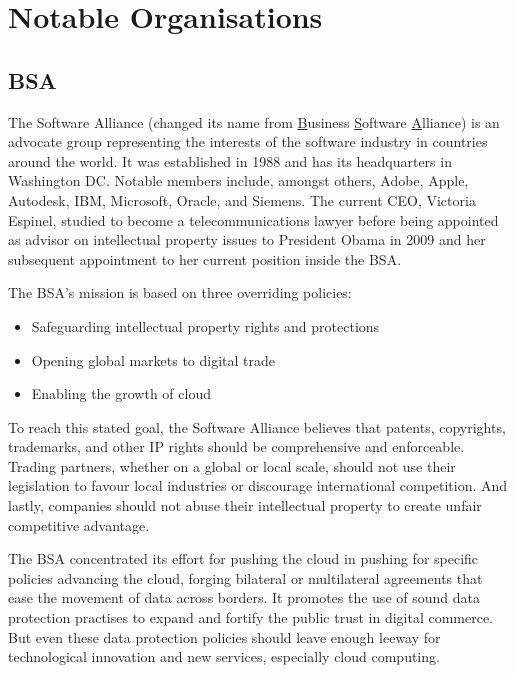 \documentclass[a4paper]{report}
\begin{document}
\section{Notable Organisations}
\label{sec:Orgas}

\subsection{BSA}
\label{ssec:BSA}
The Software Alliance (changed its name from \underline{B}usiness \underline{S}oftware \underline{A}lliance) is an advocate group representing the interests of the software industry in countries around the world. It was established in 1988 and has its headquarters in Washington DC. Notable members include, amongst others, Adobe, Apple, Autodesk, IBM, Microsoft, Oracle, and Siemens. The current CEO, Victoria Espinel, studied to become a telecommunications lawyer before being appointed as advisor on intellectual property issues to President Obama in 2009 and her subsequent appointment to her current position inside the BSA. \parencite{Rogers2017}
\vspace{\baselineskip}

\noindent The BSA's mission is based on three overriding policies:
\begin{itemize}
	\item Safeguarding intellectual property rights and protections
	\item Opening global markets to digital trade
	\item Enabling the growth of cloud 
\end{itemize}
\parencite{BSA2017}


To reach this stated goal, the Software Alliance believes that patents, copyrights, trademarks, and other IP rights should be comprehensive and enforceable. Trading partners, whether on a global or local scale, should not use their legislation to favour local industries or discourage international competition. And lastly, companies should not abuse their intellectual property to create unfair competitive advantage.

The BSA concentrated its effort for pushing the cloud in pushing for specific policies advancing the cloud, forging bilateral or multilateral agreements that ease the movement of data across borders. It promotes the use of sound data protection practises to expand and fortify the public trust in digital commerce. But even these data protection policies should leave enough leeway for technological innovation and new services, especially cloud computing.
\end{document}
